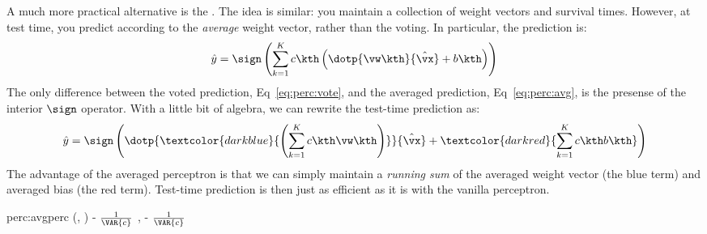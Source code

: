 
A much more practical alternative is the .  The idea is similar: you maintain a collection of
weight vectors and survival times.  However, at test time, you predict
according to the \emph{average} weight vector, rather than the
voting.  In particular, the prediction is:
\begin{equation} \label{eq:perc:avg}
  \hat y = \sign \left(
    \sum_{k=1}^K c\kth 
      \left(
        \dotp{\vw\kth}{\hat\vx} + b\kth
        \right)
      \right)
\end{equation}
The only difference between the voted prediction,
Eq~\eqref{eq:perc:vote}, and the averaged prediction,
Eq~\eqref{eq:perc:avg}, is the presense of the interior $\sign$
operator.  With a little bit of algebra, we can rewrite the test-time
prediction as:
\begin{equation}
  \hat y = \sign \left(
    \dotp{\textcolor{darkblue}{\left(
        \sum_{k=1}^K c\kth \vw\kth 
        \right)}}{\hat\vx} +
      \textcolor{darkred}{\sum_{k=1}^K c\kth b\kth}
      \right)
\end{equation}
The advantage of the averaged perceptron is that we can simply
maintain a \emph{running sum} of the averaged weight vector (the blue
term) and averaged bias (the red term).  Test-time prediction is then
just as efficient as it is with the vanilla perceptron.

\newalgorithm%
  {perc:avgperc}%
  {(, )}
  {
\ENDIF
{}
\ENDFOR
\ENDFOR
\RETURN \VAR{$\vw$} - $\frac 1 {\VAR{c}}$ , 
           - $\frac 1 {\VAR{c}}$ \VAR{$\beta$}
}

